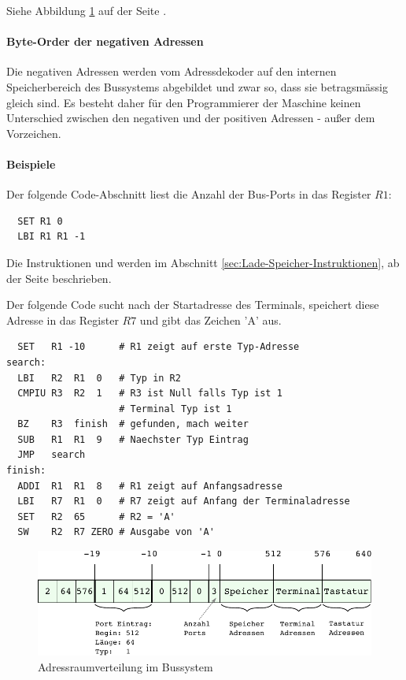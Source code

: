 Siehe Abbildung \ref{fig:Bus-Adressraumverteilung}
auf der Seite \pageref{fig:Bus-Adressraumverteilung}.

\paragraph{Byte-Order der negativen Adressen}
Die negativen Adressen werden vom Adressdekoder auf den internen
Speicherbereich des Bussystems abgebildet und zwar so, dass sie betragsmässig
gleich sind. Es besteht daher für den Programmierer der Maschine keinen
Unterschied zwischen den negativen und der positiven Adressen - außer dem
Vorzeichen.


\paragraph{Beispiele}
Der folgende Code-Abschnitt liest die Anzahl der Bus-Ports in das Register $R1$:
\begin{lstlisting}
  SET R1 0
  LBI R1 R1 -1
\end{lstlisting}
Die Instruktionen  und  werden im Abschnitt 
\ref{sec:Lade-Speicher-Instruktionen}, ab der Seite
\pageref{sec:Lade-Speicher-Instruktionen} beschrieben.


Der folgende Code sucht nach der Startadresse des Terminals, speichert diese
Adresse in das Register $R7$ und gibt das Zeichen 'A' aus.
\begin{lstlisting}
  SET   R1 -10      # R1 zeigt auf erste Typ-Adresse
search:
  LBI   R2  R1  0   # Typ in R2
  CMPIU R3  R2  1   # R3 ist Null falls Typ ist 1
                    # Terminal Typ ist 1
  BZ    R3  finish  # gefunden, mach weiter
  SUB   R1  R1  9   # Naechster Typ Eintrag
  JMP   search
finish:
  ADDI  R1  R1  8   # R1 zeigt auf Anfangsadresse
  LBI   R7  R1  0   # R7 zeigt auf Anfang der Terminaladresse
  SET   R2  65      # R2 = 'A'
  SW    R2  R7 ZERO # Ausgabe von 'A'
\end{lstlisting}



\begin{figure}[h!tp]
 \centering
 \includegraphics{img/Bus-Adressverteilung}
 \caption[Adressraumverteilung im Bussystem]
         {Adressraumverteilung im Bussystem}
 \label{fig:Bus-Adressraumverteilung}
\end{figure} 



